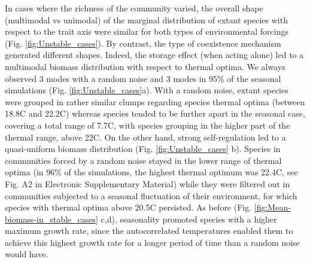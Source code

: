 \documentclass[a4paper,12pt]{article}
\begin{document}
In cases where the richness of the community varied, the overall shape
(multimodal vs unimodal) of the marginal distribution of extant species
with respect to the trait axis were similar for both types of environmental
forcings (Fig. \ref{fig:Unstable_cases}). By contrast, the type of
coexistence mechanism generated different shapes. Indeed, the storage
effect (when acting alone) led to a multimodal biomass distribution
with respect to thermal optima. We always observed 3 modes with a
random noise and 3 modes in 95\% of the seasonal simulations (Fig.
\ref{fig:Unstable_cases}a). With a random noise, extant species were
grouped in rather similar clumps regarding species thermal optima
(between 18.8\textdegree C and 22.2\textdegree C) whereas species tended to be further apart
in the seasonal case, covering a total range of 7.7\textdegree C, with species
grouping in the higher part of the thermal range, above 22\textdegree C. On the
other hand, strong self-regulation led to a quasi-uniform biomass
distribution (Fig. \ref{fig:Unstable_cases} b). Species in communities
forced by a random noise stayed in the lower range of thermal optima
(in 96\% of the simulations, the highest thermal optimum was 22.4\textdegree C,
see Fig. A2 in Electronic Supplementary Material) while they were
filtered out in communities subjected to a seasonal fluctuation of
their environment, for which species with thermal optima above 20.5\textdegree C
persisted. As before (Fig. \ref{fig:Mean-biomass-in_stable_cases}
c,d), seasonality promoted species with a higher maximum growth rate,
since the autocorrelated temperatures enabled them to achieve this
highest growth rate for a longer period of time than a random noise
would have.
\end{document}
